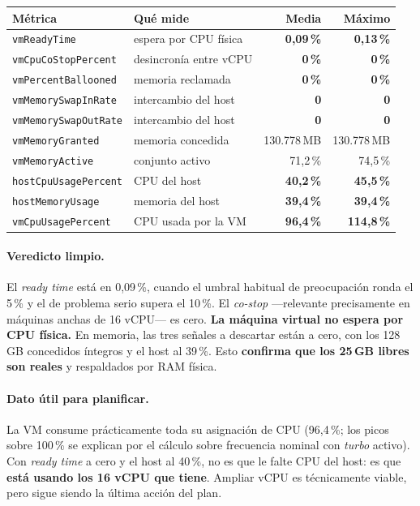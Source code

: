 \documentclass[11pt,a4paper]{article}
\newcommand{\cod}[1]{\texttt{\small #1}}
\newcommand{\bien}[1]{\textcolor{verde}{\textbf{#1}}}
\newcommand{\aviso}[1]{\textcolor{ambar}{\textbf{#1}}}
\begin{document}
\begin{table}[h]
\centering
\small
\begin{tabular}{llrr}
\toprule
\textbf{Métrica} & \textbf{Qué mide} & \textbf{Media} & \textbf{Máximo} \\
\midrule
\cod{vmReadyTime}        & espera por CPU física   & \bien{0,09\,\%} & \bien{0,13\,\%} \\
\cod{vmCpuCoStopPercent} & desincronía entre vCPU  & \bien{0\,\%}    & \bien{0\,\%} \\
\cod{vmPercentBallooned} & memoria reclamada       & \bien{0\,\%}    & \bien{0\,\%} \\
\cod{vmMemorySwapInRate} & intercambio del host    & \bien{0}        & \bien{0} \\
\cod{vmMemorySwapOutRate}& intercambio del host    & \bien{0}        & \bien{0} \\
\cod{vmMemoryGranted}    & memoria concedida       & 130.778\,MB     & 130.778\,MB \\
\cod{vmMemoryActive}     & conjunto activo         & 71,2\,\%        & 74,5\,\% \\
\cod{hostCpuUsagePercent}& CPU del host            & \bien{40,2\,\%} & \bien{45,5\,\%} \\
\cod{hostMemoryUsage}    & memoria del host        & \bien{39,4\,\%} & \bien{39,4\,\%} \\
\cod{vmCpuUsagePercent}  & CPU usada por la VM     & \aviso{96,4\,\%}& \aviso{114,8\,\%} \\
\bottomrule
\end{tabular}
\end{table}

\paragraph{Veredicto limpio.} El \emph{ready time} está en 0,09\,\%, cuando
el umbral habitual de preocupación ronda el 5\,\% y el de problema serio
supera el 10\,\%. El \emph{co-stop} —relevante precisamente en máquinas
anchas de 16 vCPU— es cero. \textbf{La máquina virtual no espera por CPU
física.} En memoria, las tres señales a descartar están a cero, con los
128\,GB concedidos íntegros y el host al 39\,\%. Esto \textbf{confirma que
los 25\,GB libres son reales} y respaldados por RAM física.

\paragraph{Dato útil para planificar.} La VM consume prácticamente toda su
asignación de CPU (96,4\,\%; los picos sobre 100\,\% se explican por el
cálculo sobre frecuencia nominal con \emph{turbo} activo). Con \emph{ready
time} a cero y el host al 40\,\%, no es que le falte CPU del host: es que
\textbf{está usando los 16 vCPU que tiene}. Ampliar vCPU es técnicamente
viable, pero sigue siendo la última acción del plan.
\end{document}
